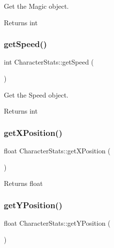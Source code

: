 Get the Magic object. 

\begin{DoxyReturn}{Returns}
int 
\end{DoxyReturn}
\mbox{\label{classCharacterStats_af7dcfe803978f4a84ea87f881d857c58}} 
\subsubsection{\texorpdfstring{getSpeed()}{getSpeed()}}
{\footnotesize\ttfamily int Character\+Stats\+::get\+Speed (\begin{DoxyParamCaption}{ }\end{DoxyParamCaption})\hspace{0.3cm}{\ttfamily [inline]}}



Get the Speed object. 

\begin{DoxyReturn}{Returns}
int 
\end{DoxyReturn}
\mbox{\label{classCharacterStats_afb86511575622311cfe30efeff513e6f}} 
\subsubsection{\texorpdfstring{getXPosition()}{getXPosition()}}
{\footnotesize\ttfamily float Character\+Stats\+::get\+X\+Position (\begin{DoxyParamCaption}{ }\end{DoxyParamCaption})\hspace{0.3cm}{\ttfamily [inline]}}

\begin{DoxyReturn}{Returns}
float 
\end{DoxyReturn}
\mbox{\label{classCharacterStats_ac8669b2ea74ea7a712463f9f2e0d05c8}} 
\subsubsection{\texorpdfstring{getYPosition()}{getYPosition()}}
{\footnotesize\ttfamily float Character\+Stats\+::get\+Y\+Position (\begin{DoxyParamCaption}{ }\end{DoxyParamCaption})\hspace{0.3cm}{\ttfamily [inline]}}

